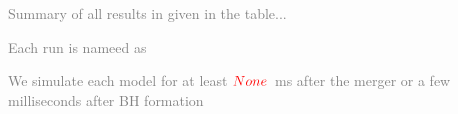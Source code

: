\documentclass[11pt,a4paper,headinclude=true,DIV=14,BCOR=8mm,chapterprefix,listof=totoc,twoside,openright,abstracton]{scrbook}
\newcommand{\red}[1]{\textcolor{red}{#1}}
\newcommand{\gray}[1]{\textcolor{gray}{#1}}
\begin{document}
\gray{Summary of all results in given in the table...}

\gray{Each run is nameed as}

\gray{We simulate each model for at least $\red{None}$~ms after the merger or a few milliseconds after BH formation}


 
\appendix



\backmatter



\end{document}
